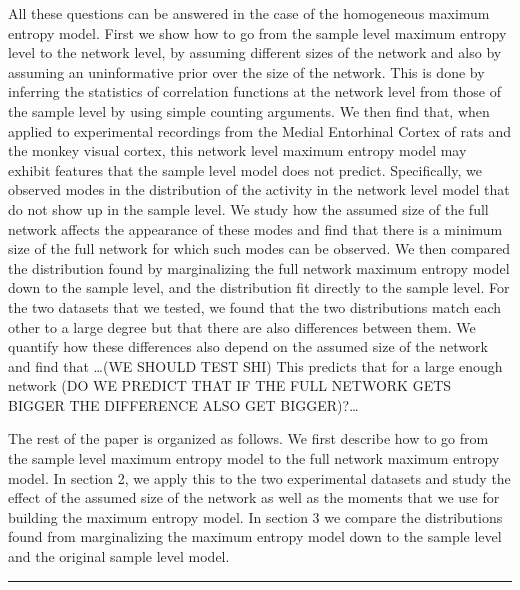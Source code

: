 \documentclass[\ifafour a4paper,12pt,\else a5paper,10pt,\fi%
onecolumn,oneside,article,%
british%
]{memoir}
\theoremstyle{remark}
\theoremstyle{innote}
\renewcommand*{\|}{\nonscript\,\vert\nonscript\;\mathopen{}}
\begin{document}
All these questions can be answered in the case of the homogeneous maximum
entropy model. First we show how to go from the sample level maximum
entropy level to the network level, by assuming different sizes of the
network and also by assuming an uninformative prior over the size of the
network. This is done by inferring the statistics of correlation functions
at the network level from those of the sample level by using simple
counting arguments. We then find that, when applied to experimental
recordings from the Medial Entorhinal Cortex of rats and the monkey visual
cortex, this network level maximum entropy model may exhibit features that
the sample level model does not predict. Specifically, we observed modes in
the distribution of the activity in the network level model that do not
show up in the sample level. We study how the assumed size of the full
network affects the appearance of these modes and find that there is a
minimum size of the full network for which such modes can be observed. We
then compared the distribution found by marginalizing the full network
maximum entropy model down to the sample level, and the distribution fit
directly to the sample level. For the two datasets that we tested, we found
that the two distributions match each other to a large degree but that
there are also differences between them. We quantify how these differences
also depend on the assumed size of the network and find that …(WE SHOULD
TEST SHI) This predicts that for a large enough network (DO WE PREDICT
THAT IF THE FULL NETWORK GETS BIGGER THE DIFFERENCE ALSO GET BIGGER)?…

The rest of the paper is organized as follows. We first describe how to go
from the sample level maximum entropy model to the full network maximum
entropy model. In section 2, we apply this to the two experimental datasets
and study the effect of the assumed size of the network as well as the
moments that we use for building the maximum entropy model. In section 3 we
compare the distributions found from marginalizing the maximum entropy
model down to the sample level and the original sample level model.


\hrule
\bigskip


\end{document}
